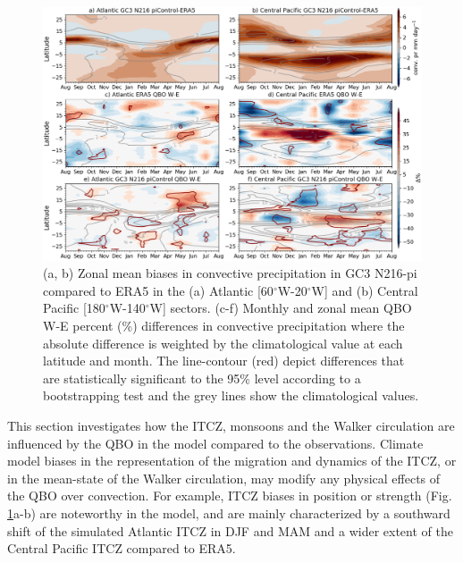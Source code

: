\begin{figure}[t!]
\centering
 \includegraphics[width=\linewidth]{figures/itcz_conv_prqbow.png}
\caption[Central Pacific ITCZ convective precipitation differences on QBO phase.]{ (a, b) Zonal mean biases in convective precipitation in GC3 N216-pi compared to ERA5 in the (a) Atlantic [60$^\circ$W-20$^\circ$W] and (b) Central Pacific [180$^\circ$W-140$^\circ$W] sectors. (c-f) Monthly and zonal mean QBO W-E percent (\%) differences in convective precipitation  where the absolute difference is weighted by the climatological value at each latitude and month. The line-contour (red) depict differences that are statistically significant to the 95\% level according to a bootstrapping test and the grey lines show the climatological values.}
\label{fig:itczqbowcp}
\end{figure}

This section investigates how the ITCZ, monsoons and the Walker circulation are influenced by the QBO in the model compared to the observations. %
Climate model biases in the representation of the migration and dynamics of the ITCZ, or in the mean-state of the Walker circulation, may modify any physical effects of the QBO over convection. 
For example, ITCZ biases in position or strength (Fig. \ref{fig:itczqbowcp}a-b) are  noteworthy in the model, and are mainly characterized by a southward shift of the simulated Atlantic ITCZ in DJF and MAM and a wider extent of the Central Pacific ITCZ compared to ERA5.

